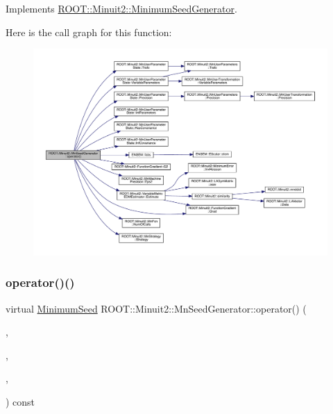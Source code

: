 Implements \mbox{\hyperlink{classROOT_1_1Minuit2_1_1MinimumSeedGenerator_ae71de52027d3f0c7fa202c7cf65b947a}{R\+O\+O\+T\+::\+Minuit2\+::\+Minimum\+Seed\+Generator}}.

Here is the call graph for this function\+:
\nopagebreak
\begin{figure}[H]
\begin{center}
\leavevmode
\includegraphics[width=350pt]{de/da5/classROOT_1_1Minuit2_1_1MnSeedGenerator_a654d0f1b67cd1a3a17de8334ba811ef0_cgraph}
\end{center}
\end{figure}
\mbox{\label{classROOT_1_1Minuit2_1_1MnSeedGenerator_a1c06ece239f548163beb232600dc8cc3}} 
\subsubsection{\texorpdfstring{operator()()}{operator()()}\hspace{0.1cm}{\footnotesize\ttfamily [2/6]}}
{\footnotesize\ttfamily virtual \mbox{\hyperlink{classROOT_1_1Minuit2_1_1MinimumSeed}{Minimum\+Seed}} R\+O\+O\+T\+::\+Minuit2\+::\+Mn\+Seed\+Generator\+::operator() (\begin{DoxyParamCaption}\item[{const \mbox{\hyperlink{classROOT_1_1Minuit2_1_1MnFcn}{Mn\+Fcn}} \&}]{,  }\item[{const \mbox{\hyperlink{classROOT_1_1Minuit2_1_1GradientCalculator}{Gradient\+Calculator}} \&}]{,  }\item[{const \mbox{\hyperlink{classROOT_1_1Minuit2_1_1MnUserParameterState}{Mn\+User\+Parameter\+State}} \&}]{,  }\item[{const \mbox{\hyperlink{classROOT_1_1Minuit2_1_1MnStrategy}{Mn\+Strategy}} \&}]{ }\end{DoxyParamCaption}) const\hspace{0.3cm}{\ttfamily [virtual]}}



